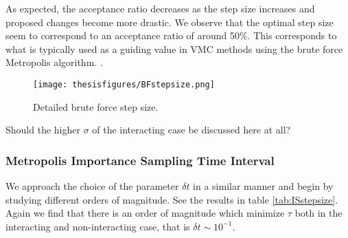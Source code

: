 \documentclass[twoside,english]{uiofysmaster}
\begin{document}
As expected, the acceptance ratio decreases as the step size increases and proposed changes become more drastic. We observe that the optimal step size seem to correspond to an acceptance ratio of around 50\%. This corresponds to what is typically used as a guiding value in VMC methods using the brute force Metropolis algorithm. \cite{Rubenstein2017}.

\begin{figure}
\centering
 \texttt{[image: thesisfigures/BFstepsize.png]}
 \caption{Detailed brute force step size.}
 \label{fig:BFstepsize}
\end{figure}

Should the higher $\sigma$ of the interacting case be discussed here at all?



\subsubsection{Metropolis Importance Sampling Time Interval}
We approach the choice of the parameter $\delta t$ in a similar manner and begin by studying different orders of magnitude. See the results in table \ref{tab:ISstepsize}. Again we find that there is an order of magnitude which minimize $\tau$ both in the interacting and non-interacting case, that is $\delta t \sim 10^{-1}$. 
\end{document}
